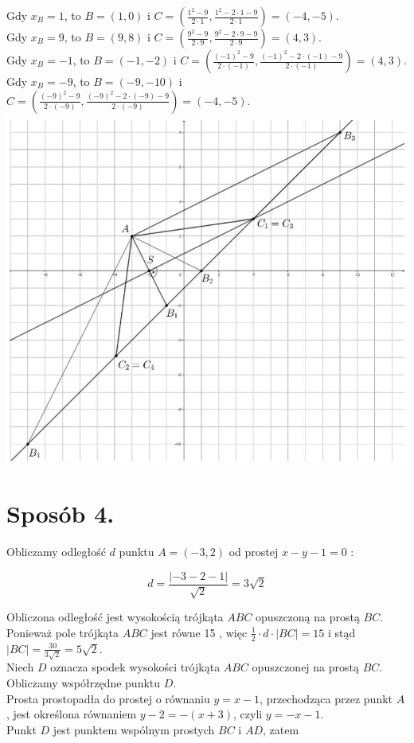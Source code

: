 \documentclass[10pt]{article}
\begin{document}
Gdy $x_{B}=1$, to $B=(1,0)$ i $C=\left(\frac{1^{2}-9}{2 \cdot 1}, \frac{1^{2}-2 \cdot 1-9}{2 \cdot 1}\right)=(-4,-5)$.\\
Gdy $x_{B}=9$, to $B=(9,8)$ i $C=\left(\frac{9^{2}-9}{2 \cdot 9}, \frac{9^{2}-2 \cdot 9-9}{2 \cdot 9}\right)=(4,3)$.\\
Gdy $x_{B}=-1$, to $B=(-1,-2)$ i $C=\left(\frac{(-1)^{2}-9}{2 \cdot(-1)}, \frac{(-1)^{2}-2 \cdot(-1)-9}{2 \cdot(-1)}\right)=(4,3)$.\\
Gdy $x_{B}=-9$, to $B=(-9,-10)$ i $C=\left(\frac{(-9)^{2}-9}{2 \cdot(-9)}, \frac{(-9)^{2}-2 \cdot(-9)-9}{2 \cdot(-9)}\right)=(-4,-5)$.\\
\includegraphics[max width=\textwidth, center]{2025_02_07_368c3175bd12651af85ag-38}

\section*{Sposób 4.}
Obliczamy odległość $d$ punktu $A=(-3,2)$ od prostej $x-y-1=0$ :

$$
d=\frac{|-3-2-1|}{\sqrt{2}}=3 \sqrt{2}
$$

Obliczona odległość jest wysokością trójkąta $A B C$ opuszczoną na prostą $B C$. Ponieważ pole trójkąta $A B C$ jest równe 15 , więc $\frac{1}{2} \cdot d \cdot|B C|=15$ i stąd $|B C|=\frac{30}{3 \sqrt{2}}=5 \sqrt{2}$.\\
Niech $D$ oznacza spodek wysokości trójkąta $A B C$ opuszczonej na prostą $B C$.\\
Obliczamy współrzędne punktu $D$.\\
Prosta prostopadła do prostej o równaniu $y=x-1$, przechodząca przez punkt $A$, jest określona równaniem $y-2=-(x+3)$, czyli $y=-x-1$.\\
Punkt $D$ jest punktem wspólnym prostych $B C$ i $A D$, zatem
\end{document}
